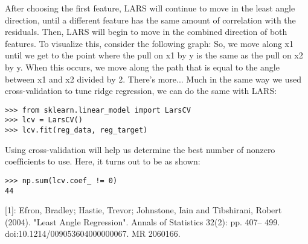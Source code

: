 \documentclass[SKL-MASTER.tex]{subfiles}
\begin{document}
After choosing the first feature, LARS will continue to move in the least angle direction, until
a different feature has the same amount of correlation with the residuals. Then, LARS will
begin to move in the combined direction of both features. To visualize this, consider the
following graph:
So, we move along x1 until we get to the point where the pull on x1 by y is the same as the
pull on x2 by y. When this occurs, we move along the path that is equal to the angle between
x1 and x2 divided by 2.
There's more...
Much in the same way we used cross-validation to tune ridge regression, we can do the same
with LARS:
\begin{framed}
\begin{verbatim}
>>> from sklearn.linear_model import LarsCV
>>> lcv = LarsCV()
>>> lcv.fit(reg_data, reg_target)
\end{verbatim}
\end{framed}
Using cross-validation will help us determine the best number of nonzero coefficients to use.
Here, it turns out to be as shown:
\begin{framed}
	\begin{verbatim}
>>> np.sum(lcv.coef_ != 0)
44
\end{verbatim}
\end{framed}
[1]: Efron, Bradley; Hastie, Trevor; Johnstone, Iain and Tibshirani, Robert
(2004). "Least Angle Regression". Annals of Statistics 32(2): pp. 407–
499. doi:10.1214/009053604000000067. MR 2060166.
\end{document}

